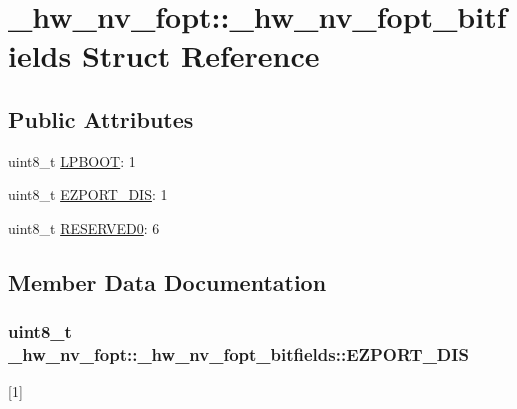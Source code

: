 \hypertarget{struct__hw__nv__fopt_1_1__hw__nv__fopt__bitfields}{}\section{\+\_\+hw\+\_\+nv\+\_\+fopt\+:\+:\+\_\+hw\+\_\+nv\+\_\+fopt\+\_\+bitfields Struct Reference}
\label{struct__hw__nv__fopt_1_1__hw__nv__fopt__bitfields}
\subsection*{Public Attributes}
\begin{DoxyCompactItemize}
\item 
uint8\+\_\+t \hyperlink{struct__hw__nv__fopt_1_1__hw__nv__fopt__bitfields_a836dc525699285fff99d3d56a17c66e0}{L\+P\+B\+O\+OT}\+: 1
\item 
uint8\+\_\+t \hyperlink{struct__hw__nv__fopt_1_1__hw__nv__fopt__bitfields_abde6398e4b61ff059d4ae153542ce807}{E\+Z\+P\+O\+R\+T\+\_\+\+D\+IS}\+: 1
\item 
uint8\+\_\+t \hyperlink{struct__hw__nv__fopt_1_1__hw__nv__fopt__bitfields_a9905767d9c9383a5bf7623e683d1279e}{R\+E\+S\+E\+R\+V\+E\+D0}\+: 6
\end{DoxyCompactItemize}


\subsection{Member Data Documentation}
\subsubsection[{\texorpdfstring{E\+Z\+P\+O\+R\+T\+\_\+\+D\+IS}{EZPORT_DIS}}]{\setlength{\rightskip}{0pt plus 5cm}uint8\+\_\+t \+\_\+hw\+\_\+nv\+\_\+fopt\+::\+\_\+hw\+\_\+nv\+\_\+fopt\+\_\+bitfields\+::\+E\+Z\+P\+O\+R\+T\+\_\+\+D\+IS}\hypertarget{struct__hw__nv__fopt_1_1__hw__nv__fopt__bitfields_abde6398e4b61ff059d4ae153542ce807}{}\label{struct__hw__nv__fopt_1_1__hw__nv__fopt__bitfields_abde6398e4b61ff059d4ae153542ce807}
\mbox{[}1\mbox{]} 
